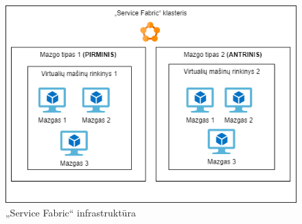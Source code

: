 \begin{figure}[htp!]
\centering
\includegraphics[scale=0.5]{img/SF_infrastructure.png}
\caption{„Service Fabric“ infrastruktūra \cite{ServiceFabricTerminology}}
\label{fig:sf_infrastructure}
\end{figure}
